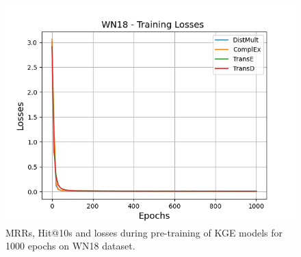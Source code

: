 \begin{figure}[H]
\begin{minipage}{.3\textwidth}
      \includegraphics[width=\linewidth]{figures/results/pretrain/wn18/pretrain_wn18_losses.png}
    \end{minipage}%
    \caption{MRRs, Hit@10s and losses during pre-training of \ac{KGE} models for 1000 epochs on \textsc{WN18} dataset.}
    \label{fig:pretraining}
\end{figure}
